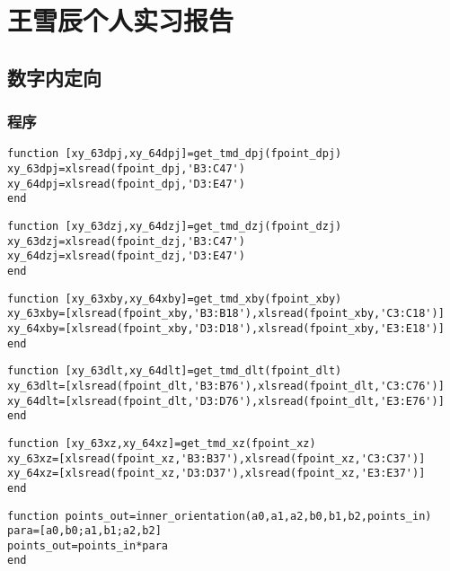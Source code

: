 \chapter{王雪辰个人实习报告}

\section{数字内定向}

\subsection{程序}

\begin{lstlisting}[caption=get\_tmd\_dpj.m]
function [xy_63dpj,xy_64dpj]=get_tmd_dpj(fpoint_dpj)
xy_63dpj=xlsread(fpoint_dpj,'B3:C47')
xy_64dpj=xlsread(fpoint_dpj,'D3:E47')
end
\end{lstlisting}

\begin{lstlisting}[caption=get\_tmd\_dzj.m]
function [xy_63dzj,xy_64dzj]=get_tmd_dzj(fpoint_dzj)
xy_63dzj=xlsread(fpoint_dzj,'B3:C47')
xy_64dzj=xlsread(fpoint_dzj,'D3:E47')
end
\end{lstlisting}

\begin{lstlisting}[caption=get\_tmd\_xby.m]
function [xy_63xby,xy_64xby]=get_tmd_xby(fpoint_xby)
xy_63xby=[xlsread(fpoint_xby,'B3:B18'),xlsread(fpoint_xby,'C3:C18')]
xy_64xby=[xlsread(fpoint_xby,'D3:D18'),xlsread(fpoint_xby,'E3:E18')]
end
\end{lstlisting}

\begin{lstlisting}[caption=get\_tmd\_dlt.m]
function [xy_63dlt,xy_64dlt]=get_tmd_dlt(fpoint_dlt)
xy_63dlt=[xlsread(fpoint_dlt,'B3:B76'),xlsread(fpoint_dlt,'C3:C76')]
xy_64dlt=[xlsread(fpoint_dlt,'D3:D76'),xlsread(fpoint_dlt,'E3:E76')]
end
\end{lstlisting}

\begin{lstlisting}[caption=get\_tmd\_xz.m]
function [xy_63xz,xy_64xz]=get_tmd_xz(fpoint_xz)
xy_63xz=[xlsread(fpoint_xz,'B3:B37'),xlsread(fpoint_xz,'C3:C37')]
xy_64xz=[xlsread(fpoint_xz,'D3:D37'),xlsread(fpoint_xz,'E3:E37')]
end
\end{lstlisting}

\begin{lstlisting}[caption=inner\_orientation.m]
function points_out=inner_orientation(a0,a1,a2,b0,b1,b2,points_in)
para=[a0,b0;a1,b1;a2,b2]
points_out=points_in*para
end
\end{lstlisting}

